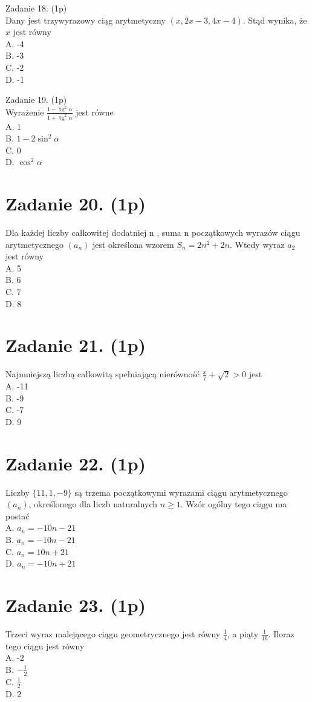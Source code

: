 \documentclass[10pt]{article}
\begin{document}
Zadanie 18. (1p)\\
Dany jest trzywyrazowy ciąg arytmetyczny \((x, 2 x-3,4 x-4)\). Stąd wynika, że \(x\) jest równy\\
A. -4\\
B. -3\\
C. -2\\
D. -1

Zadanie 19. (1p)\\
Wyrażenie \(\frac{1-\operatorname{tg}^{2} \alpha}{1+\operatorname{tg}^{2} \alpha}\) jest równe\\
A. 1\\
B. \(1-2 \sin ^{2} \alpha\)\\
C. 0\\
D. \(\cos ^{2} \alpha\)

\section*{Zadanie 20. (1p)}
Dla każdej liczby całkowitej dodatniej n , suma n początkowych wyrazów ciągu arytmetycznego \(\left(a_{n}\right)\) jest określona wzorem \(S_{n}=2 n^{2}+2 n\). Wtedy wyraz \(a_{2}\) jest równy\\
A. 5\\
B. 6\\
C. 7\\
D. 8

\section*{Zadanie 21. (1p)}
Najmniejszą liczbą całkowitą spełniającą nierówność \(\frac{x}{7}+\sqrt{2}>0\) jest\\
A. -11\\
B. -9\\
C. -7\\
D. 9

\section*{Zadanie 22. (1p)}
Liczby \(\{11,1,-9\}\) są trzema początkowymi wyrazami ciągu arytmetycznego \(\left(a_{n}\right)\), określonego dla liczb naturalnych \(n \geq 1\). Wzór ogólny tego ciągu ma postać\\
A. \(a_{n}=-10 n-21\)\\
B. \(a_{n}=-10 n-21\)\\
C. \(a_{n}=10 n+21\)\\
D. \(a_{n}=-10 n+21\)

\section*{Zadanie 23. (1p)}
Trzeci wyraz malejącego ciągu geometrycznego jest równy \(\frac{1}{4}\), a piąty \(\frac{1}{16}\). Iloraz tego ciągu jest równy\\
A. -2\\
B. \(-\frac{1}{2}\)\\
C. \(\frac{1}{2}\)\\
D. 2
\end{document}
